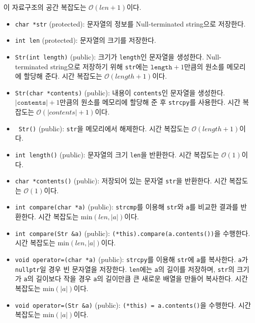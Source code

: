 이 자료구조의 공간 복잡도는 $\mathcal{O}\left(len + 1\right)$이다.

\begin{itemize}
	\item \texttt{char *str} (protected): 문자열의 정보를 Null-terminated string으로 저장한다.
	\item \texttt{int len} (protected): 문자열의 크기를 저장한다.
	\item \texttt{Str(int length)} (public): 크기가 \texttt{length}인 문자열을 생성한다. Null-terminated string으로 저장하기 위해 \texttt{str}에는 $\texttt{length} + 1$만큼의 원소를 메모리에 할당해 준다. 시간 복잡도는 $\mathcal{O}\left(length + 1\right)$이다.
	\item \texttt{Str(char *contents)} (public): 내용이 \texttt{contents}인 문자열을 생성한다. $\left|\texttt{contents}\right| + 1$만큼의 원소를 메모리에 할당해 준 후 \texttt{strcpy}를 사용한다. 시간 복잡도는 $\mathcal{O}\left(\left|contents\right| + 1\right)$이다.
	\item \texttt{~Str()} (public): \texttt{str}을 메모리에서 해제한다. 시간 복잡도는 $\mathcal{O}\left(length + 1\right)$이다.
	\item \texttt{int length()} (public): 문자열의 크기 \texttt{len}을 반환한다. 시간 복잡도는 $\mathcal{O}\left(1\right)$이다.
	\item \texttt{char *contents()} (public): 저장되어 있는 문자열 \texttt{str}을 반환한다. 시간 복잡도는 $\mathcal{O}\left(1\right)$이다.
	\item \texttt{int compare(char *a)} (public): \texttt{strcmp}를 이용해 \texttt{str}와 \texttt{a}를 비교한 결과를 반환한다. 시간 복잡도는 $\mathrm{min}\left(len, \left|a\right|\right)$이다.
	\item \texttt{int compare(Str &a)} (public):  \texttt{(*this).compare(a.contents())}을 수행한다. 시간 복잡도는 $\mathrm{min}\left(len, \left|a\right|\right)$이다.
	\item \texttt{void operator=(char *a)} (public): \texttt{strcpy}를 이용해 \texttt{str}에 \texttt{a}를 복사한다. \texttt{a}가 \texttt{nullptr}일 경우 빈 문자열을 저장한다. \texttt{len}에는 \texttt{a}의 길이를 저장하며, \texttt{str}의 크기가 \texttt{a}의 길이보다 작을 경우 \texttt{a}의 길이만큼 큰 새로운 배열을 만들어 복사한다. 시간 복잡도는 $\mathrm{min}\left(\left|a\right|\right)$이다.
	\item \texttt{void operator=(Str &a)} (public): \texttt{(*this) = a.contents()}을 수행한다. 시간 복잡도는 $\mathrm{min}\left(\left|a\right|\right)$이다.
\end{itemize}


